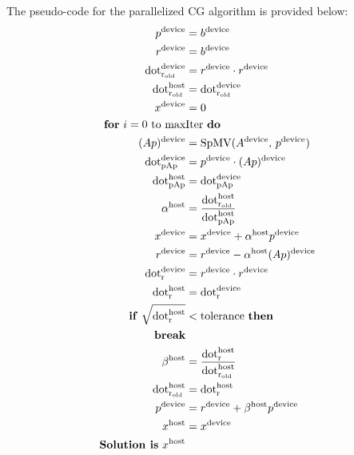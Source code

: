 \documentclass[conference]{IEEEtran}
\begin{document}
The pseudo-code for the parallelized CG algorithm is provided below:
{\tiny
\begin{align*}
p^{\text{device}} &= b^{\text{device}} \\
r^{\text{device}} &= b^{\text{device}} \\
\text{dot}_{\text{r}_{\text{old}}}^{\text{device}} &= r^{\text{device}} \cdot r^{\text{device}} \\
\text{dot}_{\text{r}_{\text{old}}}^{\text{host}} &= \text{dot}_{\text{r}_{\text{old}}}^{\text{device}} \\
x^{\text{device}} &= 0 \\
\text{\textbf{for} } i = 0 \text{ to } \text{max} & \text{Iter \textbf{do}} \\
(Ap)^{\text{device}} &= \text{SpMV}(A^{\text{device}},\, p^{\text{device}}) \\
\text{dot}_{\text{pAp}}^{\text{device}} &= p^{\text{device}} \cdot (Ap)^{\text{device}} \\
\text{dot}_{\text{pAp}}^{\text{host}} &= \text{dot}_{\text{pAp}}^{\text{device}} \\
\alpha^{\text{host}} &= \frac{\text{dot}_{\text{r}_{\text{old}}}^{\text{host}}}{\text{dot}_{\text{pAp}}^{\text{host}}} \\
x^{\text{device}} &= x^{\text{device}} + \alpha^{\text{host}} p^{\text{device}} \\
r^{\text{device}} &= r^{\text{device}} - \alpha^{\text{host}} (Ap)^{\text{device}} \\
\text{dot}_{\text{r}}^{\text{device}} &= r^{\text{device}} \cdot r^{\text{device}} \\
\text{dot}_{\text{r}}^{\text{host}} &= \text{dot}_{\text{r}}^{\text{device}} \\
\text{\textbf{if} } \sqrt{\text{dot}_{\text{r}}^{\text{host}}} &< \text{tolerance \textbf{then}} \\
\quad \text{\textbf{break}} & \\
\beta^{\text{host}} &= \frac{\text{dot}_{\text{r}}^{\text{host}}}{\text{dot}_{\text{r}_{\text{old}}}^{\text{host}}} \\
\text{dot}_{\text{r}_{\text{old}}}^{\text{host}} &= \text{dot}_{\text{r}}^{\text{host}} \\
p^{\text{device}} &= r^{\text{device}} + \beta^{\text{host}} p^{\text{device}} \\
x^{\text{host}} &= x^{\text{device}} \\
\text{\textbf{Solution is} } x^{\text{host}} &
\end{align*}
}
\end{document}

